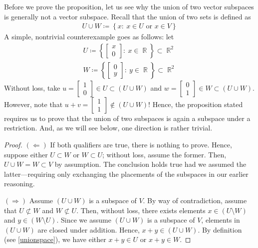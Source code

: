\documentclass{amsart}
\theoremstyle{definition}
\theoremstyle{definition}
\DeclareMathOperator{\R}{\mathbb{R}}
\DeclareMathOperator{\1}{\mathbbm{1}}
\newcommand{\condset}[4]{\left\{ #1  : \: #2 #3 #4 \right\}}
\begin{document}
\begin{enumerate}
		Before we prove the proposition, let us see why the union of two vector subspaces is generally not a vector subspace. Recall that the union of two sets is defined as
		\begin{align}
		\label{unionspace}
		U \cup W \coloneqq \condset{x}{x \in U}{\text{ or }}{x \in V}
		\end{align}
		A simple, nontrivial counterexample goes as follows: let 
		\begin{align*}
		U \coloneqq \condset{ \begin{bmatrix} x \\ 0 \end{bmatrix}}{x}{\in}{\R} \subset \R^2 \\
		W \coloneqq \condset{ \begin{bmatrix} 0 \\ y \end{bmatrix}}{y}{\in}{\R} \subset \R^2
		\end{align*}
		Without loss, take $u = \begin{bmatrix} 1 \\ 0 \end{bmatrix} \in U \subset (U \cup W)$ and $w = \begin{bmatrix} 0 \\ 1 \end{bmatrix} \in W \subset (U \cup W)$. However, note that $u + v = \begin{bmatrix} 1 \\ 1 \end{bmatrix} \not\in (U \cup W)$! Hence, the proposition stated requires us to prove that the union of two subspaces is again a subspace under a restriction. And, as we will see below, one direction is rather trivial.
		
		\bigskip 
		
		\begin{proof}
			$(\Leftarrow)$ If both qualifiers are true, there is nothing to prove. Hence, suppose either $U\subset W$ or $W\subset U$; without loss, assume the former. Then, $U \cup W = W \subset V$ by assumption. The conclusion holds true had we assumed the latter---requiring only exchanging the placements of the subspaces in our earlier reasoning.
			
			\noindent $(\Rightarrow)$ Assume $(U\cup W)$ is a subspace of $V$. By way of contradiction, assume that $U \not\subset W$ and $W \not\subset U$. Then, without loss, there exists elements $x \in (U \setminus W)$ and $y \in (W \setminus U)$. Since we assume $(U \cup W)$ is a subspace of $V$, elements in $(U \cup W)$ are closed under addition. Hence, $x + y \in (U \cup W)$. By definition (see \eqref{unionspace}), we have either $x+y \in U$ or $x+y \in W$.
			

\end{proof}
\end{enumerate}
\end{document}
